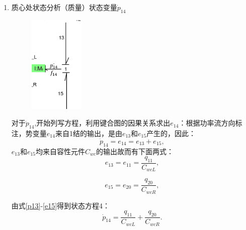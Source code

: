 \begin{enumerate}
\item {质心处状态分析（质量）状态变量$\dot{ p}_{14} $}
\begin{figure}[H]
	\centering
	\includegraphics[width=0.25\textwidth]{fig/2_equation4.png}
\end{figure}
对于$\dot{p} _ { 14 }$,开始列写方程，利用键合图的因果关系求出$e_{14}$：根据功率流方向标注，势变量$e_{14}$来自1结的输出，是由$e_{13}$和$e_{15}$产生的，因此：
\begin{equation}\label{2_e14}
\dot{p}_{14}
=
e_{14}
=
e_{13}
+
e_{15},
\end{equation}
$e_{13}$和$e_{15}$均来自容性元件$C _ { wc }$的输出故而有下面两式：
\begin{equation}\label{2_e13}
e_{13}
=
e_{11}
=
\frac{q_{11}}{C_{wc L}},
\end{equation}

\begin{equation}\label{2_e15}
e_{15}
=
e_{20}
=
\frac{q_{20}}{C_{wc R}},
\end{equation}

由式\ref{p13}-\ref{e15}得到状态方程4：
\begin{equation}\label{2_p14}
\dot{p}_{14}
=
\frac{q_{11}}{C_{wc L}}
+
\frac{q_{20}}{C_{wc R}}.
\end{equation}


\end{enumerate}

